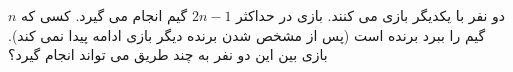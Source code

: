 \exercise
دو نفر با یکدیگر بازی می کنند. بازی در حداکثر
$2n -1$
گیم انجام می گیرد. کسی که
$n$
گیم را ببرد برنده است (پس از مشخص شدن برنده دیگر بازی ادامه پیدا نمی کند). بازی بین این دو نفر به چند طریق می تواند انجام گیرد؟